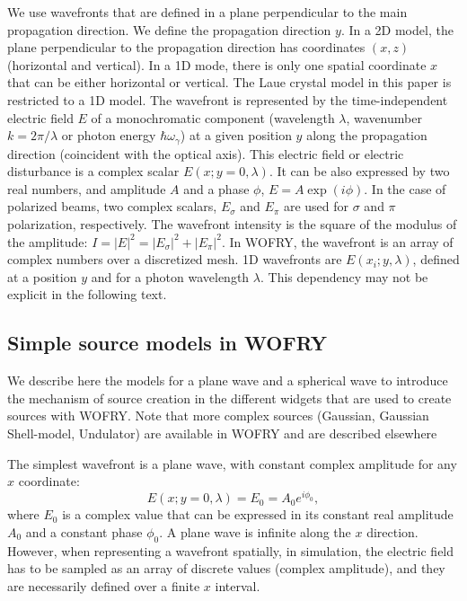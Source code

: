 \documentclass[preprint]{iucr}              %
\begin{document}
We use wavefronts that are defined in a plane perpendicular to the main propagation direction. We define the propagation direction $y$. In a 2D model, the plane perpendicular to the propagation direction has coordinates $(x,z)$ (horizontal and vertical).
In a 1D mode, there is only one spatial coordinate $x$ that can be either horizontal or vertical.
The Laue crystal model in this paper is restricted to a 1D model.
The wavefront is represented by the time-independent electric field $E$ of a monochromatic component (wavelength $\lambda$, wavenumber $k = 2 \pi / \lambda$ or photon energy $\hbar \omega_\gamma$) at a given position $y$ along the propagation direction (coincident with the optical axis).
This electric field or electric disturbance is a complex scalar $E(x;y=0,\lambda)$. It can be also expressed by two real numbers, and amplitude $A$ and a phase $\phi$,  $E= A \exp{(i\phi)}$. In the case of polarized beams, two complex scalars, $E_\sigma$ and $E_\pi$ are used for $\sigma$ and $\pi$ polarization, respectively.
The wavefront intensity is the square of the modulus of the amplitude: $I=|E|^2=|E_\sigma|^2 + |E_\pi|^2$. In WOFRY, the wavefront is an array of complex numbers over a discretized mesh. 1D wavefronts are $E(x_i;y,\lambda)$, defined at a position $y$ and for a photon wavelength $\lambda$. This dependency may not be explicit in the following text.


\subsection{Simple source models in WOFRY}

We describe here the models for a plane wave and a spherical wave to introduce the mechanism of source creation in the different widgets that are used to create sources with WOFRY. Note that more complex sources (Gaussian, Gaussian Shell-model, Undulator) are available in WOFRY and are described elsewhere \cite{WOFRYoptics}

The simplest wavefront is a plane wave, with constant complex amplitude for any $x$ coordinate: 
\begin{equation}
   E(x;y=0,\lambda)=E_0=A_0 e^{i \phi_0},
\end{equation}
where $E_0$ is a complex value that can be expressed in its constant real amplitude $A_0$ and a constant phase $\phi_0$. A plane wave is infinite along the $x$ direction. However, when representing a wavefront spatially, in simulation, the electric field has to be sampled as an array of discrete values (complex amplitude), and they are necessarily defined over a finite $x$ interval. 
\end{document}
